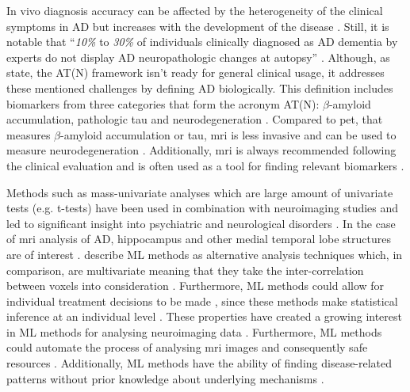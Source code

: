 In vivo diagnosis accuracy can be affected by the heterogeneity of the clinical symptoms in \gls{AD}  \autocite{ahmedHistoryPerspectiveHow2021, frisoni2011} but increases with the development of the disease \autocite{islamBrainMRIAnalysis2018}. Still, it is notable that \enquote{\textit{10\%} to \textit{30\%} of individuals clinically diagnosed as \gls{AD} dementia by experts do not display \gls{AD} neuropathologic changes at autopsy} \autocite[Nelson, 2011, as cited in][p. 538]{jackNIAAAResearchFramework2018}. Although, as \textcite{jackNIAAAResearchFramework2018} state, the AT(N) framework isn't ready for general clinical usage, it addresses these mentioned challenges by defining \gls{AD} biologically. This definition includes biomarkers from three categories that form the acronym AT(N): $\beta$-amyloid accumulation, pathologic tau and neurodegeneration \autocite{jackNIAAAResearchFramework2018}. Compared to \gls{pet}, that measures $\beta$-amyloid accumulation or tau, \gls{mri} is less invasive and can be used to measure neurodegeneration \autocite{wangDenseCNNDenselyConnected2021}. Additionally, \gls{mri} is always recommended following the clinical evaluation \autocite{SCHELTENS2021} and is often used as a tool for finding relevant biomarkers \autocite{liuMultimodelDeepConvolutional2020a}. 

Methods such as mass-univariate analyses which are large amount of univariate tests (e.g. t-tests) \autocite{groppeMassUnivariateAnalysis2011} have been used in combination with neuroimaging studies and led to significant insight into psychiatric and neurological disorders \autocite{vieiraUsingDeepLearning2017}. In the case of \gls{mri} analysis of \gls{AD}, hippocampus and other medial temporal lobe structures are of interest \autocite{islamBrainMRIAnalysis2018,SCHELTENS2021}. 
\textcite{vieiraUsingDeepLearning2017} describe \gls{ML} methods as alternative analysis techniques which, in comparison, are multivariate meaning that they take the inter-correlation between voxels into consideration \autocite{vieiraUsingDeepLearning2017}. Furthermore, \gls{ML} methods could allow for individual  treatment decisions to be made \autocite{naikDenouementsMachineLearning2020}, since these methods make statistical inference at an individual level \autocite{vieiraUsingDeepLearning2017}. These properties have created a growing interest in \gls{ML} methods for analysing neuroimaging data \autocite{vieiraUsingDeepLearning2017}. Furthermore, \gls{ML} methods could automate the process of analysing \gls{mri} images and consequently safe resources \autocite{islamBrainMRIAnalysis2018}. Additionally, \gls{ML} methods have the ability of finding disease-related patterns without prior knowledge about underlying mechanisms \autocite{nanniComparisonTransferLearning2020}. 


